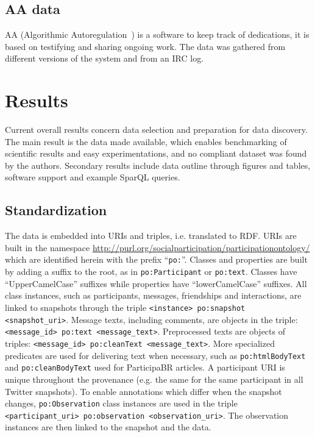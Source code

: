 \documentclass[review]{elsarticle}
\newcommand{\textttt}[1] {\texttt{\footnotesize#1}}
\begin{document}
\subsection{AA data}
AA (Algorithmic Autoregulation~\cite{aa,aa2}) is a software to keep track of dedications,
it is based on testifying and sharing ongoing work.
The data was gathered from different versions of the system and from an IRC
log.
 
\section{Results}
\label{outline}
Current overall results concern data selection and preparation for data discovery.
The main result is the data made available, which enables benchmarking of scientific results
and easy experimentations, and no compliant dataset was found by the authors.
Secondary results include data outline through figures and tables,
software support and example SparQL queries.

\subsection{Standardization}
The data is embedded into URIs and triples, i.e. translated to RDF.
URIs are built in the namespace \url{http://purl.org/socialparticipation/participationontology/}
which are identified herein with the prefix ``\textttt{po:}''.
Classes and properties are built by adding a suffix to the root, as in \textttt{po:Participant} or \textttt{po:text}.
Classes have ``UpperCamelCase'' suffixes while properties have ``lowerCamelCase'' suffixes.
All class instances, such as participants, messages, friendships and
interactions, are linked to
snapshots through the triple \textttt{<instance> po:snapshot <snapshot\_uri>}.
Message texts, including comments, are objects in the triple: \textttt{<message\_id> po:text <message\_text>}.
Preprocessed texts are objects of triples: \textttt{<message\_id> po:cleanText <message\_text>}.
More specialized predicates are used for delivering text when necessary,
such as \textttt{po:htmlBodyText} and \textttt{po:cleanBodyText} used
for ParticipaBR articles.
A participant URI is unique throughout the provenance (e.g. the same for
the same participant in all Twitter snapshots).
To enable annotations which differ when the snapshot changes,
\texttt{po:Observation} class instances are used in the triple
\textttt{<participant\_uri> po:observation <observation\_uri>}.
The observation instances are then linked to the snapshot and the
data.
\end{document}
